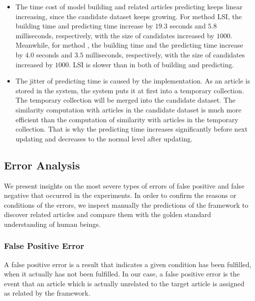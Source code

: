 \begin{itemize}
    \item The time cost of model building and related articles predicting keeps linear increasing, since the candidate dataset keeps growing. For method LSI, the building time and predicting time increase by $19.3$ seconds and $5.8$ milliseconds, respectively, with the size of candidates increased by $1000$. Meanwhile, for method \tfidf{}, the building time and the predicting time increase by $4.0$ seconds and $3.5$ milliseconds, respectively, with the size of candidates increased by $1000$. LSI is slower than \tfidf{} in both of building and predicting. 
    \item The jitter of predicting time is caused by the implementation. As an article is stored in the system, the system puts it at first into a temporary collection. The temporary collection will be merged into the candidate dataset. The similarity computation with articles in the candidate dataset is much more efficient than the computation of similarity with articles in the temporary collection. That is why the predicting time increases significantly before next updating and decreases to the normal level after updating. 
    
\end{itemize}


\subsection{Error Analysis}
\label{sec:5.5}

We present insights on the most severe types of errors of false positive and false negative that occurred in the experiments. In order to confirm the reasons or conditions of the errors, we inspect manually the predictions of the framework to discover related articles and compare them with the golden standard understanding of human beings.  

\subsubsection{False Positive Error}

A false positive error is a result that indicates a given condition has been fulfilled, when it actually has not been fulfilled. In our case, a false positive error is the event that an article which is actually unrelated to the target article is assigned as related by the framework. 

